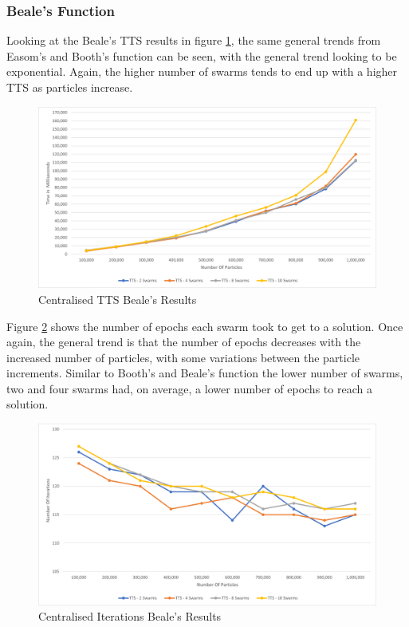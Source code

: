 \documentclass[oneside,12pt]{book}
\begin{document}
\subsubsection{Beale's Function}

Looking at the Beale's TTS results in figure \ref{fig:Centralised_TTS_Beale_Results}, the same general trends from Easom's and Booth's function can be seen, with the general trend looking to be exponential. Again, the higher number of swarms tends to end up with a higher TTS as particles increase. 

\begin{figure}[H]
    \centering
    \includegraphics[scale=0.45]{Images/Graphs/CentralisedBealeTTS.png}
    \caption{Centralised TTS Beale's Results}
    \label{fig:Centralised_TTS_Beale_Results}
\end{figure}

Figure \ref{fig:Centralised_Epoc_Beale_Results} shows the number of epochs each swarm took to get to a solution. Once again, the general trend is that the number of epochs decreases with the increased number of particles, with some variations between the particle increments. Similar to Booth's and Beale's function the lower number of swarms, two and four swarms had, on average, a lower number of epochs to reach a solution.  

\begin{figure}[H]
    \centering
    \includegraphics[scale=0.45]{Images/Graphs/CentralisedBealeEpoch.png}
    \caption{Centralised Iterations Beale's Results}
    \label{fig:Centralised_Epoc_Beale_Results}
\end{figure}
\end{document}
